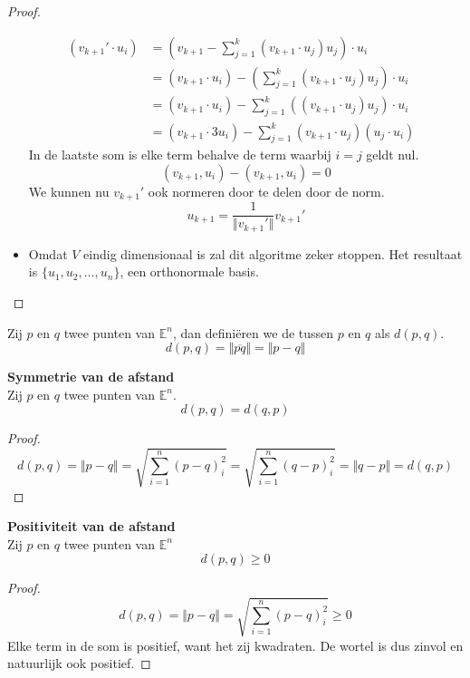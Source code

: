 \documentclass[main.tex]{subfiles}
\begin{document}
\begin{st}
\begin{proof}
\begin{itemize}
      \[
      \begin{array}{rll}
        (v_{k+1}' \cdot u_i) &= \left( v_{k+1} - \sum_{j=1}^k (v_{k+1} \cdot u_j)u_j\right) \cdot u_i &\\
                            &= (v_{k+1} \cdot u_i) - \left( \sum_{j=1}^k (v_{k+1} \cdot u_j)u_j\right) \cdot u_{i} &\\
                            &= (v_{k+1} \cdot u_i) - \sum_{j=1}^k \left((v_{k+1} \cdot u_j) u_j \right) \cdot u_i &\\
                            &= ( v_{k+1} \cdot 3u_i ) - \sum_{j=1}^k (v_{k+1} \cdot u_j ) ( u_j \cdot u_i)
      \end{array}
      \]
      In de laatste som is elke term behalve de term waarbij $i=j$ geldt nul.
      \[
      (v_{k+1},u_i) - (v_{k+1},u_i) = 0
      \]
      We kunnen nu $v_{k+1}'$ ook normeren door te delen door de norm.
      \[
      u_{k+1} = \frac{1}{\Vert v_{k+1}'\Vert}v_{k+1}'
      \]
    \item
      Omdat $V$ eindig dimensionaal is zal dit algoritme zeker stoppen. Het resultaat is $\{u_1,u_2,\ldots,u_n\}$, een orthonormale basis.
    \end{itemize}
  \end{proof}
\end{st}

\begin{de}
  Zij $p$ en $q$ twee punten van $\mathbb{E}^{n}$, dan defini\"eren we de  tussen $p$ en $q$ als $d(p,q)$.
  \[ d(p,q) = \Vert \overline{pq} \Vert = \Vert p-q \Vert \]
\end{de}

\begin{ei}
  \label{ei:symmetrie-afstand}
  \textbf{Symmetrie van de afstand}\\
  Zij $p$ en $q$ twee punten van $\mathbb{E}^{n}$.
  \[ d(p,q) = d(q,p) \]

  \begin{proof}
    \[ d(p,q) = \Vert p-q \Vert = \sqrt{\sum_{i=1}^{n}(p-q)^{2}_{i}} = \sqrt{\sum_{i=1}^{n}(q-p)^{2}_{i}} = \Vert q-p \Vert = d(q,p) \]
  \end{proof}
\end{ei}

\begin{ei}
  \label{ei:afstand-positief}
  \textbf{ Positiviteit van de afstand}\\
  Zij $p$ en $q$ twee punten van $\mathbb{E}^{n}$
  \[ d(p,q) \ge 0 \]

  \begin{proof}
    \[ d(p,q) = \Vert p-q \Vert = \sqrt{\sum_{i=1}^{n}(p-q)^{2}_{i}} \ge 0 \]
    Elke term in de som is positief, want het zij kwadraten.
    De wortel is dus zinvol en natuurlijk ook positief.
  \end{proof}
\end{ei}
\end{document}
